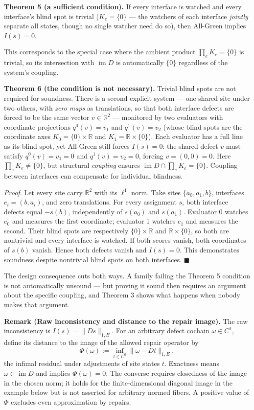 \documentclass[
  11pt,
]{article}
\theoremstyle{plain}
\theoremstyle{definition}\newtheorem{definition}[theorem]{Definition}
\theoremstyle{remark}\newtheorem*{remark}{Remark}
\begin{document}
\textbf{Theorem 5 (a sufficient condition).} If every interface is
watched and every interface's blind spot is trivial (\(K_e=\{0\}\) ---
the watchers of each interface \emph{jointly} separate all states,
though no single watcher need do so), then All-Green implies \(I(s)=0\).

This corresponds to the special case where the ambient product
\(\prod_e K_e = \{0\}\) is trivial, so its intersection with
\(\operatorname{im} D\) is automatically \(\{0\}\) regardless of the
system's coupling.

\textbf{Theorem 6 (the condition is not necessary).} Trivial blind spots
are not required for soundness. There is a second explicit system ---
one shared site under two others, with \emph{zero maps} as translations,
so that both interface defects are forced to be the same vector
\(v \in \mathbb R^2\) --- monitored by two evaluators with coordinate
projections \(q^0(v) = v_1\) and \(q^1(v) = v_2\) (whose blind spots are
the coordinate axes \(K_0 = \{0\} \times \mathbb R\) and
\(K_1 = \mathbb R \times \{0\}\)). Each evaluator has a full line as its
blind spot, yet All-Green still forces \(I(s)=0\): the shared defect
\(v\) must satisfy \(q^0(v) = v_1 = 0\) and \(q^1(v) = v_2 = 0\),
forcing \(v = (0, 0) = 0\). Here \(\prod_e K_e \ne \{0\}\), but
structural \emph{coupling} ensures
\(\operatorname{im} D \cap \prod_e K_e = \{0\}\). Coupling between
interfaces can compensate for individual blindness.

\emph{Proof.} Let every site carry \(\mathbb R^2\) with its \(\ell^1\)
norm. Take sites \(\{a_0,a_1,b\}\), interfaces \(e_i=(b,a_i)\), and zero
translations. For every assignment \(s\), both interface defects equal
\(-s(b)\), independently of \(s(a_0)\) and \(s(a_1)\). Evaluator 0
watches \(e_0\) and measures the first coordinate; evaluator 1 watches
\(e_1\) and measures the second. Their blind spots are respectively
\(\{0\}\times\mathbb R\) and \(\mathbb R\times\{0\}\), so both are
nontrivial and every interface is watched. If both scores vanish, both
coordinates of \(s(b)\) vanish. Hence both defects vanish and
\(I(s)=0\). This demonstrates soundness despite nontrivial blind spots
on both interfaces. \(\blacksquare\)

The design consequence cuts both ways. A family failing the Theorem 5
condition is not automatically unsound --- but proving it sound then
requires an argument about the specific coupling, and Theorem 3 shows
what happens when nobody makes that argument.

\textbf{Remark (Raw inconsistency and distance to the repair image).}
The raw inconsistency is \(I(s)=\lVert Ds\rVert_{1,E}\). For an
arbitrary defect cochain \(\omega\in C^1\), define its distance to the
image of the allowed repair operator by
\[\Phi(\omega):=\inf_{t\in C^0}\lVert\omega-Dt\rVert_{1,E},\] the
infimal residual under adjustments of site states \(t\). Exactness means
\(\omega\in\operatorname{im}D\) and implies \(\Phi(\omega)=0\). The
converse requires closedness of the image in the chosen norm; it holds
for the finite-dimensional diagonal image in the example below but is
not asserted for arbitrary normed fibers. A positive value of \(\Phi\)
excludes even approximation by repairs.
\end{document}
